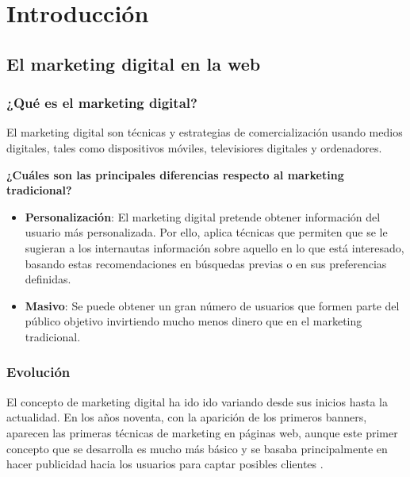\chapter{Introducción}


\section{El marketing digital en la web}


\subsection{¿Qué es el marketing digital?}

El marketing digital son técnicas y estrategias de comercialización usando medios digitales, tales como dispositivos móviles, televisiores digitales y ordenadores.

\vspace{5 mm}

\textbf{¿Cuáles son las principales diferencias respecto al marketing tradicional?} 

\vspace{5 mm}

\begin{itemize}

\item \textbf{Personalización}: El marketing digital pretende obtener información del usuario más personalizada. Por ello, aplica técnicas que permiten que se le sugieran a los internautas información sobre aquello en lo que está interesado, basando estas recomendaciones en búsquedas previas o en sus preferencias definidas.

\item \textbf{Masivo}: Se puede obtener un gran número de usuarios que formen parte del público objetivo invirtiendo mucho menos dinero que en el marketing tradicional.


\end{itemize}

\subsection{Evolución}

El concepto de marketing digital ha ido ido variando desde sus inicios hasta la actualidad. En los años noventa, con la aparición de los primeros banners, aparecen las primeras técnicas de marketing en páginas web, aunque este primer concepto que se desarrolla es mucho más básico y se basaba principalmente en hacer publicidad hacia los usuarios para captar posibles clientes \cite{marketing-evolution}.

